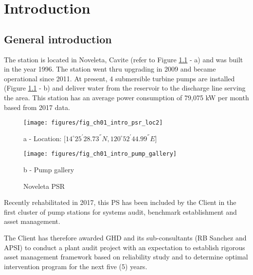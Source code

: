 
\chapter{Introduction} %
\label{Chapter1}

\section{General introduction} \label{namdario}
The station is located in Noveleta, Cavite (refer to Figure \ref{ch01_keyplan} - a) and was built in the year 1996. The station went thru upgrading in 2009 and became operational since 2011. At present, 4 submersible turbine pumps are installed (Figure \ref{ch01_keyplan} - b) and deliver water from the reservoir to the discharge line serving the area. This station has an average power consumption of 79,075 kW per month based from 2017 data.

\begin{figure}[!htb]
	\begin{minipage}[b]{0.5\linewidth}
		\centering
		\texttt{[image: figures/fig\_ch01\_intro\_psr\_loc2]}
		\caption*{a - Location: [$14^{\circ}25^{'}28.73^{''}N, 120^{\circ}52^{'}44.99^{''}E$]}
	\end{minipage}
	\hspace{0.05cm}
	\begin{minipage}[b]{0.5\linewidth}
		\centering
		\texttt{[image: figures/fig\_ch01\_intro\_pump\_gallery]}
		\caption*{b - Pump gallery}
	\end{minipage}
	\caption{Noveleta PSR}
	\label{ch01_keyplan}
\end{figure}



Recently rehabilitated in 2017, this PS has been included by the Client in the first cluster of pump stations for systems audit, benchmark establishment and asset management.

The Client has therefore awarded GHD and its sub-consultants (RB Sanchez and APSI) to conduct a plant audit project with an expectation to establish rigorous asset management framework based on reliability study and to determine optimal intervention program for the next five (5) years.

